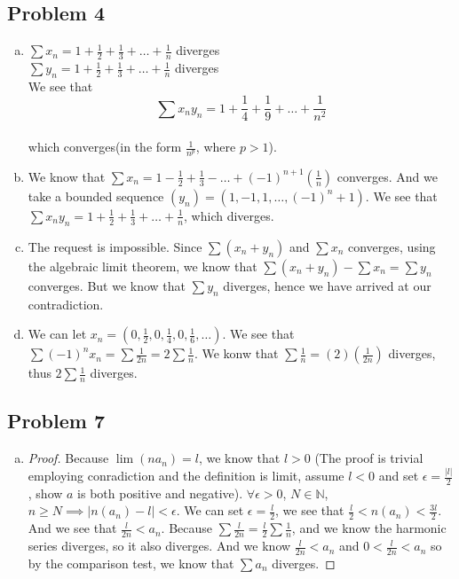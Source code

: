 \documentclass[12pt]{article}
\begin{document}
\subsection*{Problem 4}
\begin{enumerate}[a).]
    \item {
        $\sum x_n = 1 + \frac{1}{2} + \frac{1}{3} + \dots + \frac{1}{n}$ diverges\\
        $\sum y_n = 1 + \frac{1}{2} + \frac{1}{3} + \dots + \frac{1}{n}$ diverges\\
        We see that 
        $$\sum x_ny_n = 1 + \frac{1}{4} + \frac{1}{9} + \dots + \frac{1}{n^2}$$\\
        which converges(in the form $\frac{1}{n^p}$, where $p > 1$).
    }
    \item {
        We know that $\sum x_n = 1 - \frac{1}{2} + \frac{1}{3} - \dots + (-1)^{n+1}(\frac{1}{n})$ converges.
        And we take a bounded sequence $(y_n) = (1, -1, 1, \dots, (-1)^n+1)$. 
        We see that $\sum x_ny_n = 1 + \frac{1}{2} + \frac{1}{3} + \dots + \frac{1}{n}$, which diverges.

    }
    \item {
        The request is impossible.
        Since $\sum (x_n + y_n)$ and $\sum x_n$ converges, using the algebraic limit theorem, we know that $\sum(x_n + y_n) - \sum x_n = \sum y_n$ converges.
        But we know that $\sum y_n$ diverges, hence we have arrived at our contradiction.
    }
    \item {
        We can let $x_n = (0, \frac{1}{2}, 0, \frac{1}{4}, 0, \frac{1}{6}, \dots)$. 
        We see that $\sum (-1)^n x_n = \sum \frac{1}{2n} = 2 \sum \frac{1}{n}$. 
        We konw that $\sum \frac{1}{n} = (2)(\frac{1}{2n})$ diverges, thus $2 \sum \frac{1}{n}$ diverges.
    }
\end{enumerate}


\subsection*{Problem 7}
\begin{enumerate}[a).]
    \item {
        \begin{proof}
            Because $\lim (n a_n) = l$, we know that $l > 0$ (The proof is trivial employing conradiction and the definition is limit, assume $l < 0$ and set $\epsilon = \frac{|l|}{2}$, show $a$ is both positive and negative).
            $\forall \epsilon > 0$, $N \in \mathbb{N}$, $ n \ge N \implies |n(a_n) - l | < \epsilon$. 
            We can set $\epsilon = \frac{l}{2}$, we see that $\frac{l}{2} < n(a_n) < \frac{3l}{2}$. 
            And we see that $\frac{l}{2n} < a_n$. 
            Because $\sum \frac{l}{2n} = \frac{l}{2}\sum\frac{1}{n}$, and we know the harmonic series diverges, so it also diverges. 
            And we know $\frac{l}{2n} < a_n$ and $0 < \frac{l}{2n} < a_n$ so by the comparison test, we know that $\sum a_n$ diverges.
        \end{proof}
    }
\end{enumerate}
\end{document}

